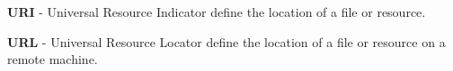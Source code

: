{\bfseries U\+R\+I} -\/ Universal Resource Indicator define the location of a file or resource.

{\bfseries U\+R\+L} -\/ Universal Resource Locator define the location of a file or resource on a remote machine. 